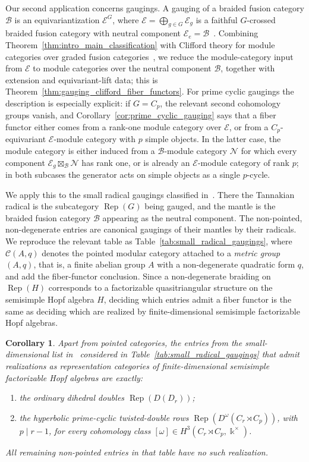 \documentclass[12pt]{amsart}
\theoremstyle{plain}
\newtheorem{corollary}[theorem]{Corollary}
\theoremstyle{definition} %
\theoremstyle{remark} %
\newcommand{\ku}{{\Bbbk}} %
\newcommand{\cC}{\mathcal{C}}
\newcommand{\cB}{\mathcal{B}}
\newcommand{\cE}{\mathcal{E}}
\newcommand{\cN}{\mathcal{N}}
\newcommand{\Rep}{\operatorname{Rep}}
\begin{document}
Our second application concerns gaugings. A gauging of a braided fusion category $\cB$ is an equivariantization $\cE^G$, where $\cE=\bigoplus_{g\in G}\cE_g$ is a faithful $G$-crossed braided fusion category with neutral component $\cE_e=\cB$~\cite{CGPW16, ENO10}. Combining Theorem~\ref{thm:intro_main_classification} with Clifford theory for module categories over graded fusion categories~\cite{Gal12, MM20}, we reduce the module-category input from $\cE$ to module categories over the neutral component $\cB$, together with extension and equivariant-lift data; this is Theorem~\ref{thm:gauging_clifford_fiber_functors}. For prime cyclic gaugings the description is especially explicit: if $G=C_p$, the relevant second cohomology groups vanish, and Corollary~\ref{cor:prime_cyclic_gauging} says that a fiber functor either comes from a rank-one module category over $\cE$, or from a $C_p$-equivariant $\cE$-module category with $p$ simple objects. In the latter case, the module category is either induced from a $\cB$-module category $\cN$ for which every component $\cE_g\boxtimes_{\cB}\cN$ has rank one, or is already an $\cE$-module category of rank $p$; in both subcases the generator acts on simple objects as a single $p$-cycle.

We apply this to the small radical gaugings classified in~\cite{GNradical}. There the Tannakian radical is the subcategory $\Rep(G)$ being gauged, and the mantle is the braided fusion category $\cB$ appearing as the neutral component. The non-pointed, non-degenerate entries are canonical gaugings of their mantles by their radicals. We reproduce the relevant table as Table~\ref{tab:small_radical_gaugings}, where $\cC(A,q)$ denotes the pointed modular category attached to a \emph{metric group} $(A,q)$, that is, a finite abelian group $A$ with a non-degenerate quadratic form $q$, and add the fiber-functor conclusion. Since a non-degenerate braiding on $\Rep(H)$ corresponds to a factorizable quasitriangular structure on the semisimple Hopf algebra $H$, deciding which entries admit a fiber functor is the same as deciding which are realized by finite-dimensional semisimple factorizable Hopf algebras.

\begin{corollary}\label{cor:intro_factorizable_realizations}
Apart from pointed categories, the entries from the small-dimensional list in~\cite{GNradical} considered in Table~\ref{tab:small_radical_gaugings} that admit realizations as representation categories of finite-dimensional semisimple factorizable Hopf algebras are exactly:
\begin{enumerate}
\item the ordinary dihedral doubles $\Rep(D(D_r))$;
\item the hyperbolic prime-cyclic twisted-double rows $\Rep(D^\omega(C_r\rtimes C_p))$, with $p\mid r-1$, for every cohomology class $[\omega]\in H^3(C_r\rtimes C_p,\ku^\times)$.
\end{enumerate}
All remaining non-pointed entries in that table have no such realization.
\end{corollary}
\end{document}
